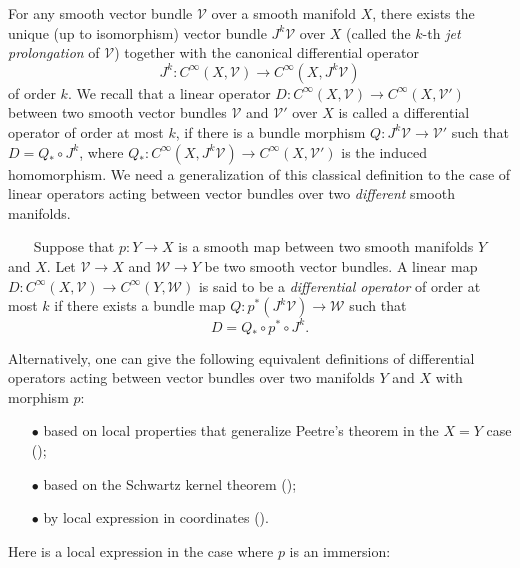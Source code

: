 For any smooth vector bundle ${\mathcal{V}}$
 over a smooth manifold $X$, 
 there exists the unique (up to isomorphism)
 vector bundle $J^k {\mathcal{V}}$
 over $X$
 (called the $k$-th 
{\it{jet prolongation}} of ${\mathcal{V}}$)
 together with the canonical differential operator
\[
   J^k \colon C^{\infty}(X,{\mathcal{V}}) \to C^{\infty}(X,J^k{\mathcal{V}})
\]
of order $k$.  
We recall that a linear operator
$
   D \colon C^{\infty}(X,{\mathcal{V}}) \to C^{\infty}(X,{\mathcal{V}}')
$
between two smooth vector bundles ${\mathcal{V}}$ and ${\mathcal{V}}'$
 over $X$ is called
 a differential operator
 of order at most $k$, 
 if there is a bundle morphism
$
   Q \colon J^k{\mathcal{V}} \to {\mathcal{V}}'
$
 such that $D=Q_{\ast} \circ J^k$, 
 where $Q_{\ast} \colon C^{\infty}(X,J^k{\mathcal{V}}) \to C^{\infty}(X,{\mathcal{V}}')$ is the induced homomorphism.  
We need a generalization
of this classical definition to the case
 of linear operators
 acting between vector bundles
 over two {\it{different}} smooth manifolds.  
\begin{definition}
\label{def:diff}
~~~\newline
Suppose that $p \colon Y \to X$
 is a smooth map between two smooth manifolds $Y$ and $X$.  
Let ${\mathcal{V}} \to X$ and ${\mathcal{W}} \to Y$ 
 be  two smooth vector bundles.  
A linear map 
$
   D \colon  C^{\infty}(X,{\mathcal{V}}) \to C^{\infty}(Y,{\mathcal{W}})
$
 is said to be a {\it{differential operator}}
 of order at most $k$
 if there exists a bundle map 
 $Q \colon p^{\ast}(J^k{\mathcal{V}}) \to {\mathcal{W}}$ such that 
\[
   D= Q_{\ast} \circ p^{\ast} \circ J^k.  
\]
\end{definition}
Alternatively, 
one can give the following equivalent definitions
 of differential operators acting between vector bundles
 over two manifolds $Y$ and $X$ with morphism $p$:
\begin{enumerate}
\item[$\bullet$]
based on local properties that generalize Peetre's theorem
 \cite{Pe}
 in the $X=Y$ case
 (\cite[Def.~2.1]{KP1});
\item[$\bullet$]
based on the Schwartz kernel theorem
 (\cite[Lem.~2.3]{KP1});
\item[$\bullet$]
by local expression in coordinates
(\cite[Ex.~2.4]{KP1}).  
\end{enumerate}
Here is a local expression 
 in the case where $p$ is an immersion:
